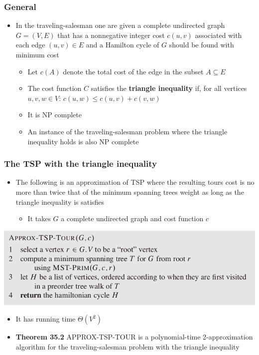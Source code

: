 \documentclass[11pt]{article}
\begin{document}
\subsubsection{General}
\label{sec:orgae94955}
\begin{itemize}
\item In the traveling-salesman one are given a complete undirected graph \(G=(V,E)\) that has a nonnegative integer cost \(c(u,v)\) associated with each edge \((u,v) \in E\) and a Hamilton cycle of \(G\) should be found with minimum cost
\begin{itemize}
\item Let \(c(A)\) denote the total cost of the edge in the subset \(A \subseteq E\)
\item The cost function \(C\) satisfies the \textbf{triangle inequality} if, for all vertices \(u,v,w \in V\): \(c(u,w) \leq c(u,v) + c(v,w)\)
\item It is NP complete
\item An instance of the traveling-salesman problem where the triangle inequality holds is also NP complete
\end{itemize}
\end{itemize}

\subsubsection{The TSP with the triangle inequality}
\label{sec:org9942d9b}
\begin{itemize}
\item The following is an approximation of TSP where the resulting tours cost is no more than twice that of the minimum spanning trees weight as long as the triangle inequality is satisfies
\begin{itemize}
\item It takes \(G\) a complete undirected graph and cost function \(c\)
\end{itemize}
\end{itemize}
\begin{center}
\includegraphics[width=.9\linewidth]{Approximation Algorithms/screenshot_2019-04-25_14-24-24.png}
\end{center}
\begin{itemize}
\item It has running time \(\Theta(V^2)\)

\item \textbf{Theorem 35.2} APPROX-TSP-TOUR is a polynomial-time 2-approximation algorithm for the traveling-salesman problem with the triangle inequality
\end{itemize}
\end{document}
